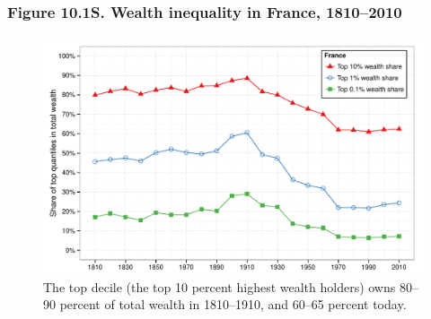 \documentclass[t]{beamer}\usepackage[]{graphicx}\usepackage[]{color}
\newenvironment{knitrout}{}{} %
\begin{document}
\begin{frame}[label=Figure_10_1S]
\frametitle{Figure 10.1S. Wealth inequality in France, 1810--2010}
\begin{figure}[t]
\begin{minipage}[b]{\textwidth}
\centering
\begin{knitrout}\footnotesize
{}\color{fgcolor}

{\centering \includegraphics[width=1\linewidth]{figures/color/Figure_10_1S} 

}



\end{knitrout}
\caption{The top decile (the top 10 percent highest wealth holders) owns 80--90 percent of total wealth in 1810--1910, and 60--65 percent today.}
\end{minipage}
\end{figure}
\end{frame}
\end{document}

